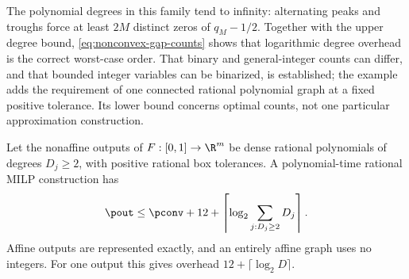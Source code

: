 The polynomial degrees in this family tend to infinity: alternating
peaks and troughs force at least $2M$ distinct zeros of $q_M-1/2$.
Together with the upper degree bound, \eqref{eq:nonconvex-gap-counts}
shows that logarithmic degree overhead is the correct worst-case order.
That binary and general-integer counts can differ, and that bounded
integer variables can be binarized, is established; the example adds the
requirement of one connected rational polynomial graph at a fixed positive
tolerance. Its lower bound concerns optimal counts, not one particular
approximation construction.

\begin{theorem}\label{thm:arbitrary-vector-overlay}
Let the nonaffine outputs of $F:[0,1]\to\R^m$ be dense rational
polynomials of degrees $D_j\ge2$, with positive rational box tolerances.
A polynomial-time rational MILP construction has
\begin{equation}\label{eq:arbitrary-vector-count}
 \pout\le\pconv+12+\left\lceil\log_2\sum_{j:D_j\ge2}D_j\right\rceil.
\end{equation}
Affine outputs are represented exactly, and an entirely affine graph
uses no integers. For one output this gives overhead
$12+\lceil\log_2D\rceil$.
\end{theorem}
